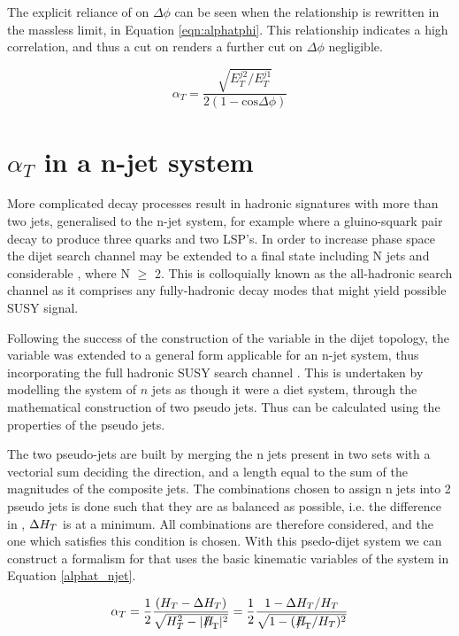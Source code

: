 The explicit reliance of \alt on $\Delta \phi$ can be seen when the relationship is rewritten in the massless limit, in Equation \ref{eqn:alphatphi}. This relationship indicates a high correlation, and thus a cut on \alt renders a further cut on $\Delta \phi$ negligible\cite{ANaT}.

\begin{equation}
\alpha_{T} = \frac{\sqrt{E_{T}^{j2}/E_{T}^{j1}}}{2(1- \textrm{cos} \Delta \phi)} 
\label{eqn:alphat}
\end{equation}


\section{$\alpha_{T}$ in a n-jet system}
More complicated decay processes result in hadronic signatures with more than two jets, generalised to the n-jet system, for example where a gluino-squark pair decay to produce three quarks and two LSP's. In order to increase phase space the dijet search channel may be extended to a final state including N jets and considerable \met, where N $\geq$ 2. This is colloquially known as the all-hadronic search channel as it comprises any fully-hadronic decay modes that might yield possible SUSY signal. 

Following the success of the construction of the \alt variable in the dijet topology, the variable was extended to a general form applicable for an n-jet system, thus incorporating the full hadronic SUSY search channel\cite{ANnaT} . This is undertaken by modelling the system of $n$ jets as though it were a diet system, through the mathematical construction of two pseudo jets. Thus \alt can be calculated using the properties of the pseudo jets. 

The two pseudo-jets are built by merging the n jets present in two sets with a vectorial sum deciding the direction, and a length equal to the sum of the magnitudes of the composite jets. The combinations chosen to assign n jets into 2 pseudo jets is done such that they are as balanced as possible, i.e. the difference in \HT, $\Delta H_{T}$ is at a minimum. All combinations are therefore considered, and the one which satisfies this condition is chosen. With this psedo-dijet system we can construct a formalism for \alt that uses the basic kinematic variables of the system in Equation \ref{alphat_njet}. 

\begin{equation}
\alpha_{T} =\frac{1}{2} \frac{(\HT - \Delta \HT)}{\sqrt{\HT^{2} - |\mht|^{2}}}  = \frac{1}{2} \frac{1-\Delta \HT / \HT}{\sqrt{1 - (\mht / \HT)^{2}}}
\label{eqn:alphat_njet}
\end{equation}

